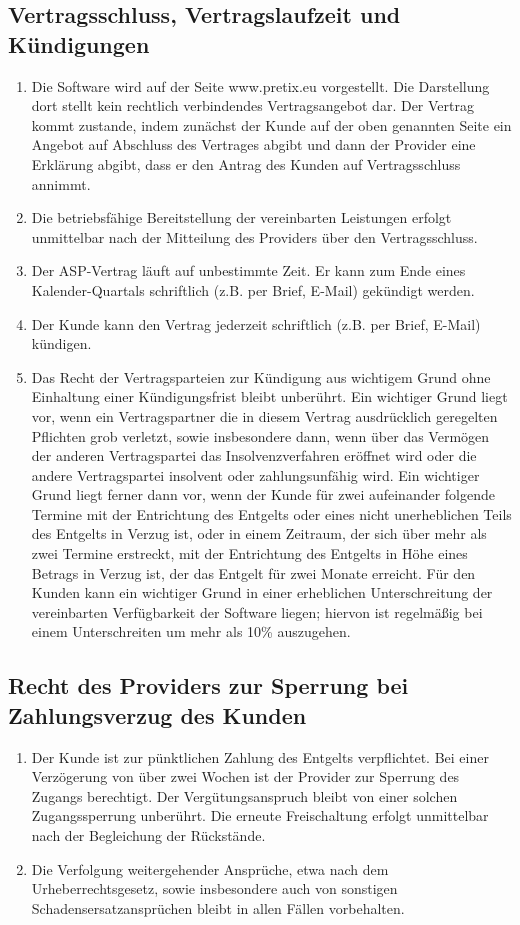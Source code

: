 \documentclass{terms}
\begin{document}
\subsection{Vertragsschluss, Vertragslaufzeit und Kündigungen}
\begin{enumerate}
\item Die Software wird auf der Seite www.pretix.eu vorgestellt. Die Darstellung dort stellt kein rechtlich verbindendes Vertragsangebot dar. Der Vertrag kommt zustande, indem zunächst der Kunde auf der oben genannten Seite ein Angebot auf Abschluss des Vertrages abgibt und dann der Provider eine Erklärung abgibt, dass er den Antrag des Kunden auf Vertragsschluss annimmt. 
\item Die betriebsfähige Bereitstellung der vereinbarten Leistungen erfolgt unmittelbar nach der Mitteilung des Providers über den Vertragsschluss.
\item Der ASP-Vertrag läuft auf unbestimmte Zeit. Er kann zum Ende eines Kalender-Quartals schriftlich (z.B. per Brief, E-Mail) gekündigt werden.
\item Der Kunde kann den Vertrag jederzeit schriftlich (z.B. per Brief, E-Mail) kündigen.
\item Das Recht der Vertragsparteien zur Kündigung aus wichtigem Grund ohne Einhaltung einer Kündigungsfrist bleibt unberührt. Ein wichtiger Grund liegt vor, wenn ein Vertragspartner die in diesem Vertrag ausdrücklich geregelten Pflichten grob verletzt, sowie insbesondere dann, wenn über das Vermögen der anderen Vertragspartei das Insolvenzverfahren eröffnet wird oder die andere Vertragspartei insolvent oder zahlungsunfähig wird. Ein wichtiger Grund liegt ferner dann vor, wenn der Kunde für zwei aufeinander folgende Termine mit der Entrichtung des Entgelts oder eines nicht unerheblichen Teils des Entgelts in Verzug ist, oder in einem Zeitraum, der sich über mehr als zwei Termine erstreckt, mit der Entrichtung des Entgelts in Höhe eines Betrags in Verzug ist, der das Entgelt für zwei Monate erreicht. Für den Kunden kann ein wichtiger Grund in einer erheblichen Unterschreitung der vereinbarten Verfügbarkeit der Software liegen; hiervon ist regelmäßig bei einem Unterschreiten um mehr als 10\% auszugehen.
\end{enumerate}

\subsection{Recht des Providers zur Sperrung bei Zahlungsverzug des Kunden}
\begin{enumerate}
\item Der Kunde ist zur pünktlichen Zahlung des Entgelts verpflichtet. Bei einer Verzögerung von über zwei Wochen ist der Provider zur Sperrung des Zugangs berechtigt. Der Vergütungsanspruch bleibt von einer solchen Zugangssperrung unberührt. Die erneute Freischaltung erfolgt unmittelbar nach der Begleichung der Rückstände.
\item Die Verfolgung weitergehender Ansprüche, etwa nach dem Urheberrechtsgesetz, sowie insbesondere auch von sonstigen Schadensersatzansprüchen bleibt in allen Fällen vorbehalten.
\end{enumerate}
\end{document}
